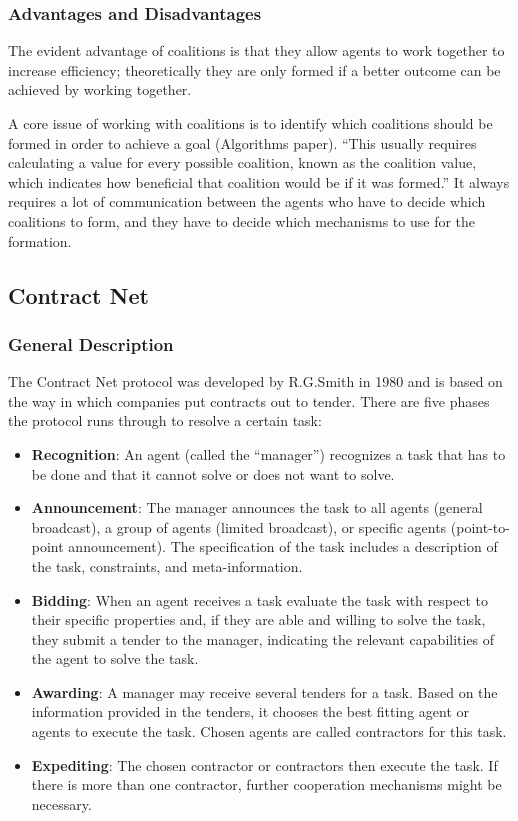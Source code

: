 \subsubsection{Advantages and Disadvantages}

The evident advantage of coalitions is that they allow agents to work together to increase efficiency; theoretically they are only formed if a better outcome can be achieved by working together. 

A core issue of working with coalitions is to identify which coalitions should be formed in order to achieve a goal (Algorithms paper). “This usually requires calculating a value for every possible coalition, known as the coalition value, which indicates how beneficial that coalition would be if it was formed.” It always requires a lot of communication between the agents who have to decide which coalitions to form, and they have to decide which mechanisms to use for the formation. 



\subsection{Contract Net}

\subsubsection{General Description}

The Contract Net protocol was developed by R.G.Smith in 1980 \cite{Smith:1980:CNP:1311969.1312903} and is based on the way in which companies put contracts out to tender. There are five phases the protocol runs through to resolve a certain task:

\begin{itemize}
	\item \textbf{Recognition}: An agent (called the ``manager'') recognizes a task that has to be done and that it cannot solve or does not want to solve.
	\item \textbf{Announcement}: The manager announces the task to all agents (general broadcast), a group of agents (limited broadcast), or specific agents (point-to-point announcement). The specification of the task includes a description of the task, constraints, and meta-information.
	\item \textbf{Bidding}: When an agent receives a task evaluate the task with respect to their specific properties and, if they are able and willing to solve the task, they submit a tender to the manager, indicating the relevant capabilities of the agent to solve the task.
	\item \textbf{Awarding}: A manager may receive several tenders for a task. Based on the information provided in the tenders, it chooses the best fitting agent or agents to execute the task. Chosen agents are called contractors for this task.
	\item \textbf{Expediting}: The chosen contractor or contractors then execute the task. If there is more than one contractor, further cooperation mechanisms might be necessary.
\end{itemize}

